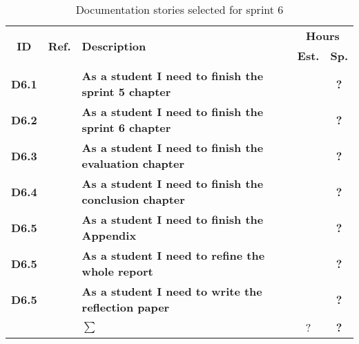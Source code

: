 \begin{table*}[!ht]%
 \def\arraystretch{1.25}
 
 \caption{Documentation stories selected for sprint 6}
   \label{tab:sprint6Documentationstories}

\begin{tabularx}{\textwidth}{ccXcc} 

\toprule[0.5mm]
\multirow{2}{*}{\textbf{ID}} &
\multirow{2}{*}{\textbf{Ref.}} & \multirow{2}{*}{\textbf{Description}} & \multicolumn{2}{c}{\textbf{Hours}} \\
 					& & & \textbf{Est.} & \textbf{Sp.} \\
\midrule

\textbf{D6.1} 	& & {\bf As a student I need to finish the sprint 5 chapter} 		&   & \textbf{?} \\
	
\textbf{D6.2} 	& & {\bf As a student I need to finish the sprint 6 chapter} 		& 	& \textbf{?} \\

\textbf{D6.3} 	& & {\bf As a student I need to finish the evaluation chapter} 		& 	& \textbf{?} \\

\textbf{D6.4} 	&& {\bf As a student I need to finish the conclusion chapter} 		& 	& \textbf{?} \\

\textbf{D6.5} 	&& {\bf As a student I need to finish the Appendix} 				& 	& \textbf{?} \\

\textbf{D6.5} 	&& {\bf As a student I need to refine the whole report} 			& 	& \textbf{?} \\
\textbf{D6.5} 	&& {\bf As a student I need to write the reflection paper} 			& 	& \textbf{?} \\
\midrule
		
				&& \textbf{$\sum$}		&	?	& \textbf{?}
 \\																			
\bottomrule[0.5mm]
\end{tabularx}
\end{table*}

